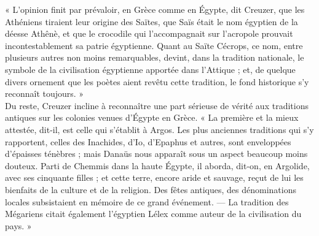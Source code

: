 \documentclass[a4paper, 11pt, oneside]{article}
\begin{document}
{« L'opinion finit par prévaloir, en Grèce comme en Égypte, dit Creuzer, que les Athéniens tiraient leur origine des Saïtes, que Saïs était le nom égyptien de la déesse Athênè, et que le crocodile qui l'accompagnait sur l'acropole prouvait incontestablement sa patrie égyptienne. Quant au Saïte Cécrops, ce nom, entre plusieurs autres non moins remarquables, devint, dans la tradition nationale, le symbole de la civilisation égyptienne apportée dans l'Attique ; et, de quelque divers ornement que les poètes aient revêtu cette tradition, le fond historique s'y reconnaît toujours. »\\\hspace*{5mm}Du reste, Creuzer incline à reconnaître une part sérieuse de vérité aux traditions antiques sur les colonies venues d'Égypte en Grèce. « La première et la mieux attestée, dit-il, est celle qui s'établit à Argos. Les plus anciennes traditions qui s'y rapportent, celles des Inachides, d'Io, d'Epaphus et autres, sont enveloppées d'épaisses ténèbres ; mais Danaüs nous apparaît sous un aspect beaucoup moins douteux. Parti de Chemmis dans la haute Égypte, il aborda, dit-on, en Argolide, avec ses cinquante filles ; et cette terre, encore aride et sauvage, reçut de lui les bienfaits de la culture et de la religion. Des fêtes antiques, des dénominations locales subsistaient en mémoire de ce grand événement. --- La tradition des Mégariens citait également l'égyptien Lélex comme auteur de la civilisation du pays. »}
\end{document}
